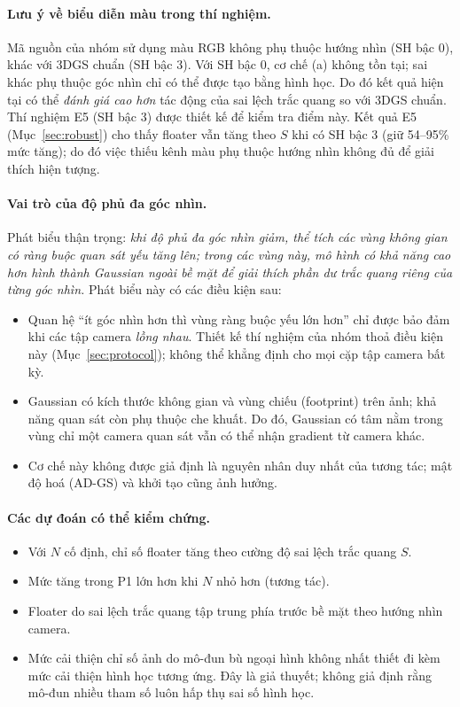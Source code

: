 \documentclass[11pt,a4paper]{article}
\begin{document}
\paragraph{Lưu ý về biểu diễn màu trong thí nghiệm.} Mã nguồn của nhóm sử dụng màu RGB không phụ thuộc hướng nhìn (SH bậc 0), khác với 3DGS chuẩn (SH bậc 3). Với SH bậc 0, cơ chế (a) không tồn tại; sai khác phụ thuộc góc nhìn chỉ có thể được tạo bằng hình học. Do đó kết quả hiện tại có thể \emph{đánh giá cao hơn} tác động của sai lệch trắc quang so với 3DGS chuẩn. Thí nghiệm E5 (SH bậc 3) được thiết kế để kiểm tra điểm này. Kết quả E5 (Mục~\ref{sec:robust}) cho thấy floater vẫn tăng theo $S$ khi có SH bậc 3 (giữ 54--95\% mức tăng); do đó việc thiếu kênh màu phụ thuộc hướng nhìn không đủ để giải thích hiện tượng.

\paragraph{Vai trò của độ phủ đa góc nhìn.} Phát biểu thận trọng: \emph{khi độ phủ đa góc nhìn giảm, thể tích các vùng không gian có ràng buộc quan sát yếu tăng lên; trong các vùng này, mô hình có khả năng cao hơn hình thành Gaussian ngoài bề mặt để giải thích phần dư trắc quang riêng của từng góc nhìn.} Phát biểu này có các điều kiện sau:
\begin{itemize}
  \item Quan hệ ``ít góc nhìn hơn thì vùng ràng buộc yếu lớn hơn'' chỉ được bảo đảm khi các tập camera \emph{lồng nhau}. Thiết kế thí nghiệm của nhóm thoả điều kiện này (Mục~\ref{sec:protocol}); không thể khẳng định cho mọi cặp tập camera bất kỳ.
  \item Gaussian có kích thước không gian và vùng chiếu (footprint) trên ảnh; khả năng quan sát còn phụ thuộc che khuất. Do đó, Gaussian có tâm nằm trong vùng chỉ một camera quan sát vẫn có thể nhận gradient từ camera khác.
  \item Cơ chế này không được giả định là nguyên nhân duy nhất của tương tác; mật độ hoá (AD-GS) và khởi tạo cũng ảnh hưởng.
\end{itemize}

\paragraph{Các dự đoán có thể kiểm chứng.}
\begin{itemize}
  \item[\textbf{P1.}] Với $N$ cố định, chỉ số floater tăng theo cường độ sai lệch trắc quang $S$.
  \item[\textbf{P2.}] Mức tăng trong P1 lớn hơn khi $N$ nhỏ hơn (tương tác).
  \item[\textbf{P3.}] Floater do sai lệch trắc quang tập trung phía trước bề mặt theo hướng nhìn camera.
  \item[\textbf{P4.}] Mức cải thiện chỉ số ảnh do mô-đun bù ngoại hình không nhất thiết đi kèm mức cải thiện hình học tương ứng. Đây là giả thuyết; không giả định rằng mô-đun nhiều tham số luôn hấp thụ sai số hình học.
\end{itemize}
\end{document}
